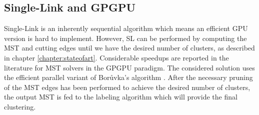 \subsection{Single-Link and GPGPU}
\label{sec:sl gpu}
Single-Link is an inherently sequential algorithm which means an efficient GPU version is hard to implement.
However, SL can be performed by computing the MST and cutting edges until we have the desired number of clusters, as described in chapter \ref{chapter:stateofart}.
Considerable speedups are reported in the literature for MST solvers in the GPGPU paradigm.
The considered solution uses the efficient parallel variant of Borůvka's algorithm \cite{Sousa2015}.
After the necessary pruning of the MST edges has been performed to achieve the desired number of clusters, the output MST is fed to the labeling algorithm which will provide the final clustering.


